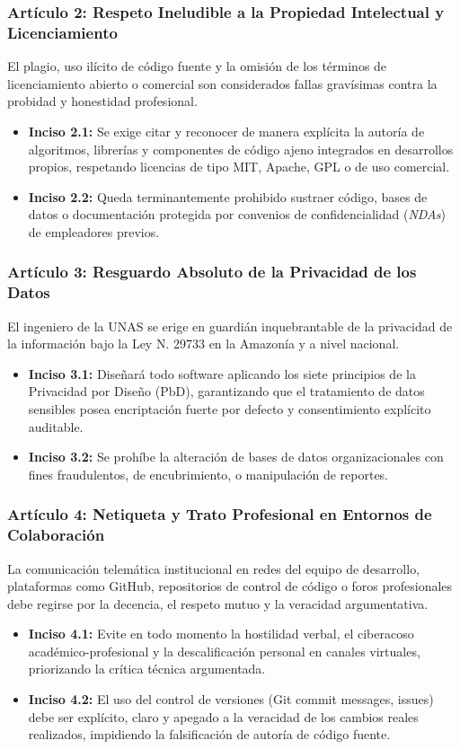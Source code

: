 \documentclass[12pt,a4paper]{article}
\begin{document}
\subsubsection*{Artículo 2: Respeto Ineludible a la Propiedad Intelectual y Licenciamiento}
El plagio, uso ilícito de código fuente y la omisión de los términos de licenciamiento abierto o comercial son considerados fallas gravísimas contra la probidad y honestidad profesional.
\begin{itemize}
    \item \textbf{Inciso 2.1:} Se exige citar y reconocer de manera explícita la autoría de algoritmos, librerías y componentes de código ajeno integrados en desarrollos propios, respetando licencias de tipo MIT, Apache, GPL o de uso comercial.
    \item \textbf{Inciso 2.2:} Queda terminantemente prohibido sustraer código, bases de datos o documentación protegida por convenios de confidencialidad (\textit{NDAs}) de empleadores previos.
\end{itemize}

\subsubsection*{Artículo 3: Resguardo Absoluto de la Privacidad de los Datos}
El ingeniero de la UNAS se erige en guardián inquebrantable de la privacidad de la información bajo la Ley N.{\circ} 29733 en la Amazonía y a nivel nacional.
\begin{itemize}
    \item \textbf{Inciso 3.1:} Diseñará todo software aplicando los siete principios de la Privacidad por Diseño (PbD), garantizando que el tratamiento de datos sensibles posea encriptación fuerte por defecto y consentimiento explícito auditable.
    \item \textbf{Inciso 3.2:} Se prohíbe la alteración de bases de datos organizacionales con fines fraudulentos, de encubrimiento, o manipulación de reportes.
\end{itemize}

\subsubsection*{Artículo 4: Netiqueta y Trato Profesional en Entornos de Colaboración}
La comunicación telemática institucional en redes del equipo de desarrollo, plataformas como GitHub, repositorios de control de código o foros profesionales debe regirse por la decencia, el respeto mutuo y la veracidad argumentativa.
\begin{itemize}
    \item \textbf{Inciso 4.1:} Evite en todo momento la hostilidad verbal, el ciberacoso académico-profesional y la descalificación personal en canales virtuales, priorizando la crítica técnica argumentada.
    \item \textbf{Inciso 4.2:} El uso del control de versiones (Git commit messages, issues) debe ser explícito, claro y apegado a la veracidad de los cambios reales realizados, impidiendo la falsificación de autoría de código fuente.
\end{itemize}
\end{document}
